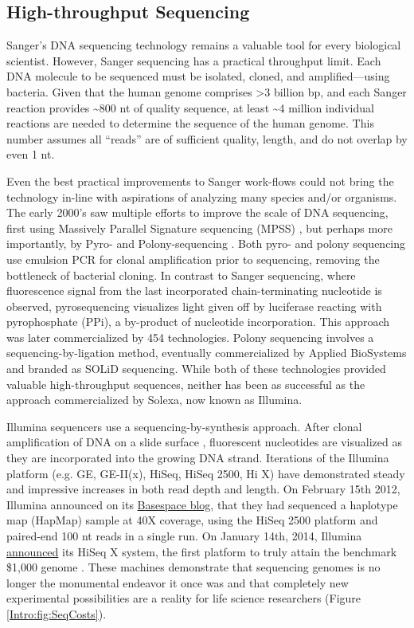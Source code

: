   \subsection{High-throughput Sequencing}
    \label{Intro:subsec: History of HTS}

    Sanger's DNA sequencing technology remains a valuable tool for every biological scientist. However, Sanger sequencing has a practical throughput limit. Each DNA molecule to be sequenced must be isolated, cloned, and amplified---using bacteria. Given that the human genome \citep{Hattori2005a} comprises >3 billion bp, and each Sanger reaction provides \textasciitilde800 nt of quality sequence, at least \textasciitilde4 million individual reactions are needed to determine the sequence of the human genome. This number assumes all ``reads'' are of sufficient quality, length, and do not overlap by even 1 nt.

    Even the best practical improvements to Sanger work-flows could not bring the technology in-line with aspirations of analyzing many species and/or organisms. The early 2000's saw multiple efforts to improve the scale of DNA sequencing, first using Massively Parallel Signature sequencing (MPSS) \citep{Brenner2000a}, but perhaps more importantly, by Pyro- \citep{Ronaghi1998a} and Polony-sequencing \citep{Shendure2005}. Both pyro- and polony sequencing use emulsion PCR \citep{Nakano2003a} for clonal amplification prior to sequencing, removing the bottleneck of bacterial cloning. In contrast to Sanger sequencing, where fluorescence signal from the last incorporated chain-terminating nucleotide is observed, pyrosequencing visualizes light given off by luciferase reacting with pyrophosphate (PPi), a by-product of nucleotide incorporation. This approach was later commercialized by 454 technologies. Polony sequencing involves a sequencing-by-ligation method, eventually commercialized by Applied BioSystems and branded as SOLiD sequencing. 
    While both of these technologies provided valuable high-throughput sequences, neither has been as successful as the approach commercialized by Solexa, now known as Illumina.

    Illumina sequencers use a sequencing-by-synthesis approach. After clonal amplification of DNA on a slide surface \citep{Bentley2008}, fluorescent nucleotides are visualized as they are incorporated into the growing DNA strand. Iterations of the Illumina platform (e.g. GE, GE-II(x), HiSeq, HiSeq 2500, Hi X) have demonstrated steady and impressive increases in both read depth and length. On February 15th 2012, Illumina announced on its \href{http://blog.basespace.illumina.com/}{Basespace blog}, that they had sequenced a haplotype map (HapMap) sample at 40X coverage, using the HiSeq 2500 platform and paired-end 100 nt reads in a single run. On January 14th, 2014, Illumina \href{http://bit.ly/PZpegZ}{announced} its HiSeq X system, the first platform to truly attain the benchmark \$1,000 genome \citep{Service2006,Hayden2014}. These machines demonstrate that sequencing genomes is no longer the monumental endeavor it once was and that completely new experimental possibilities are a reality for life science researchers (Figure \ref{Intro:fig:SeqCosts}).

